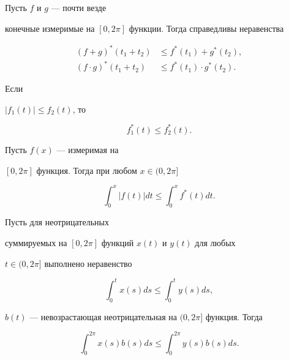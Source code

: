 \begin{lem} Пусть $f$ и $g$ --- почти везде


конечные измеримые на $[0,2\pi]$ функции. Тогда справедливы неравенства


\begin{align*}


(f+g)^*(t_1+t_2)&\le f^*(t_1)+g^*(t_2),\\


(f\cdot g)^*(t_1+t_2)&\le f^*(t_1)\cdot g^*(t_2).


\end{align*}


\end{lem}





\begin{lem} Если


$|f_1(t)|\le f_2(t)$, то


$$


f^*_1(t)\le f^*_2(t).


$$


\end{lem}





\begin{lem} Пусть $f(x)$ --- измеримая на


$[0,2\pi]$ функция. Тогда при любом $x\in(0,2\pi]$


$$


\int^x_0|f(t)|dt\le\int^x_0 f^*(t)dt.


$$


\end{lem}





\begin{lem} Пусть для неотрицательных


суммируемых на $[0,2\pi]$ функций $x(t)$ и $y(t)$ для любых


$t\in(0,2\pi]$ выполнено неравенство


$$


\int^t_0 x(s)ds\le\int^t_0 y(s)ds,


$$


$b(t)$ --- невозрастающая неотрицательная на $(0,2\pi]$ функция. Тогда


$$


\int^{2\pi}_0 x(s)b(s)ds\le\int^{2\pi}_0 y(s)b(s)ds.


$$


\end{lem}





